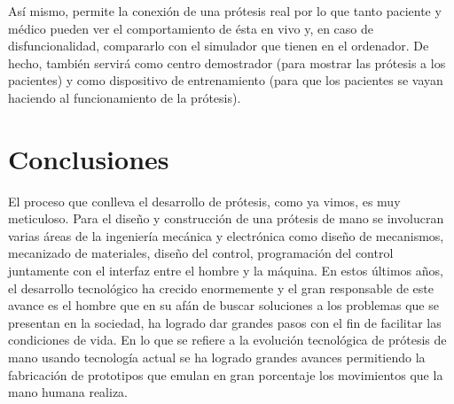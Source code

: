 \documentclass{article}
\begin{document}
Así mismo, permite la conexión de una prótesis real por lo que tanto paciente y médico pueden ver el comportamiento de ésta en vivo y, en caso de disfuncionalidad, compararlo con el simulador que tienen en el ordenador. De hecho, también servirá como centro demostrador (para mostrar las prótesis a los pacientes) y como dispositivo de entrenamiento (para que los pacientes se vayan haciendo al funcionamiento de la prótesis).





\section{Conclusiones}

El proceso que conlleva el desarrollo de prótesis, como ya vimos, es muy meticuloso. Para el diseño y construcción de una prótesis de mano se involucran varias áreas de la ingeniería mecánica y electrónica como diseño de mecanismos, mecanizado de materiales, diseño del control, programación del control juntamente con el interfaz entre el hombre y la máquina. En estos últimos años, el desarrollo tecnológico ha crecido enormemente y el gran responsable de este avance es el hombre que en su afán de buscar soluciones a los problemas que se presentan en la sociedad, ha logrado dar grandes pasos con el fin de facilitar las condiciones de vida. En lo que se refiere a la evolución tecnológica de prótesis de mano usando tecnología actual se ha logrado grandes avances permitiendo la fabricación de prototipos que emulan en gran porcentaje los movimientos que la mano humana realiza.




\end{document}
